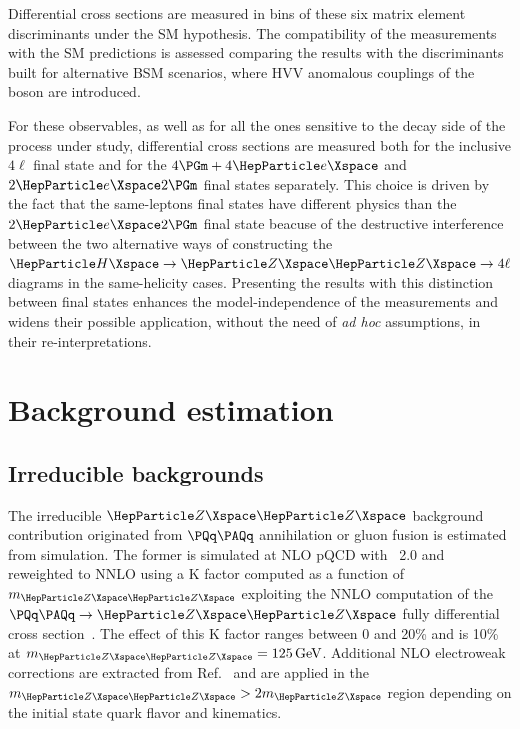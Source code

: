 Differential cross sections are measured in bins of these six matrix element discriminants under the SM hypothesis.
The compatibility of the measurements with the SM predictions is assessed comparing the results with the discriminants built for alternative BSM scenarios, where HVV anomalous couplings of the \PH boson are introduced.

For these observables, as well as for all the ones sensitive to the decay side of the process under study, differential cross sections are measured both for the inclusive $4\ell$ final state and for the $4\Pgm+4\Pe$ and $2\Pe2\Pgm$ final states separately.
This choice is driven by the fact that the same-leptons final states have different physics than the $2\Pe2\Pgm$  final state beacuse of the destructive interference between the two alternative ways of constructing the $\HZZfl$ diagrams in the same-helicity cases.
Presenting the results with this distinction between final states enhances the model-independence of the measurements and widens their possible application, without the need of \textit{ad hoc} assumptions, in their re-interpretations.

\section{Background estimation}
\label{sec:bkgd}

\subsection{Irreducible backgrounds}
\label{sec:irrbkgd}
The irreducible $\PZ\PZ$ background contribution originated from $\Pq\Paq$ annihilation or gluon fusion is estimated from simulation. 
The former is simulated at NLO pQCD with \POWHEG~2.0 and reweighted to NNLO using a K factor computed as a function of $m_{\PZ\PZ}$ exploiting the NNLO computation of the $\qqZZ$ fully differential cross section~\cite{Grazzini2015407}.
The effect of this K factor ranges between 0 and 20\% and is 10\% at $m_{\PZ\PZ}=125\GeV$.
Additional NLO electroweak corrections are extracted from Ref.~\cite{Bierweiler:2013dja} and are applied in the $m_{\PZ \PZ}>2m_{\PZ}$ region depending on the initial state quark flavor and kinematics.

